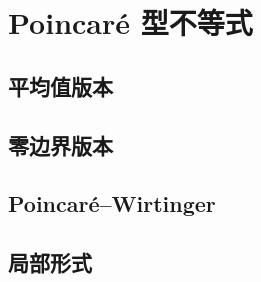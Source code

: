 \section{Poincaré 型不等式}
\label{b1:sec:2401}


\subsection{平均值版本}
\label{b1:subsec:240101}

\subsection{零边界版本}
\label{b1:subsec:240102}

\subsection{Poincaré–Wirtinger}
\label{b1:subsec:240103}

\subsection{局部形式}
\label{b1:subsec:240104}


